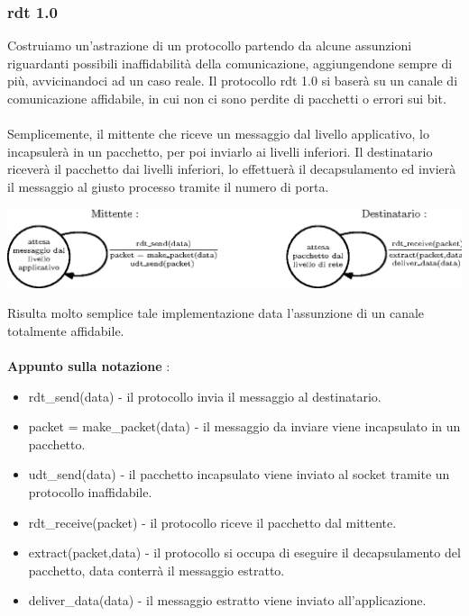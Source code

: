 \documentclass[12pt, letterpaper]{article}
\newcommand{\acc}{\\\hphantom{}\\}
\begin{document}
\subsubsection{rdt 1.0}
Costruiamo un'astrazione di un protocollo partendo da alcune assunzioni riguardanti possibili
inaffidabilità della comunicazione, aggiungendone sempre di più,
avvicinandoci ad un caso reale. Il protocollo rdt 1.0 si baserà su un
canale di comunicazione affidabile, in cui non ci sono perdite di
pacchetti o errori sui bit.\acc
Semplicemente, il mittente che riceve un messaggio dal livello applicativo,
lo incapsulerà in un pacchetto, per poi inviarlo ai livelli inferiori.
Il destinatario riceverà il pacchetto dai livelli inferiori, lo
effettuerà il decapsulamento ed invierà il messaggio al giusto
processo tramite il numero di porta.\begin{center}
    \includegraphics[width=\textwidth ]{images/rdt1.0.eps}
\end{center}
Risulta molto semplice tale implementazione data l'assunzione di un
canale totalmente affidabile.\acc
\textbf{Appunto sulla notazione} : \begin{itemize}
    \item rdt\_send(data) - il protocollo invia il messaggio al
          destinatario.
    \item packet = make\_packet(data) - il messaggio da inviare viene
          incapsulato in un pacchetto.
    \item udt\_send(data) - il pacchetto incapsulato viene inviato
          al socket tramite un protocollo inaffidabile.
    \item rdt\_receive(packet) - il protocollo riceve il pacchetto dal mittente. 
    \item extract(packet,data) - il protocollo si occupa di eseguire il decapsulamento del pacchetto,
    data conterrà il messaggio estratto. 
    \item deliver\_data(data) - il messaggio estratto viene inviato all'applicazione.
\end{itemize}
\end{document}
